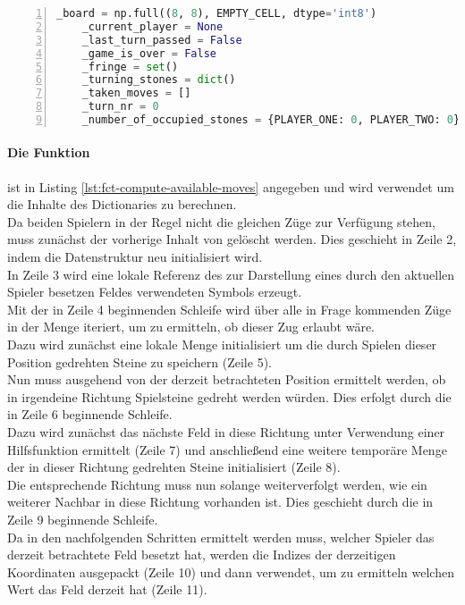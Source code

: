 \begin{lstlisting}[basicstyle=\footnotesize, caption = {Klassenvariablen der Klasse \mxZitat{Othello}}, language = python, captionpos = t , numbers=left, label={lst:class-vars-othello}]
    _board = np.full((8, 8), EMPTY_CELL, dtype='int8')
    _current_player = None 
    _last_turn_passed = False
    _game_is_over = False
    _fringe = set()
    _turning_stones = dict()    
    _taken_moves = []
    _turn_nr = 0
    _number_of_occupied_stones = {PLAYER_ONE: 0, PLAYER_TWO: 0}
\end{lstlisting}
\paragraph{Die Funktion }
 ist in Listing \ref{lst:fct-compute-available-moves} angegeben und wird verwendet um die Inhalte des Dictionaries  zu berechnen.
\\Da beiden Spielern in der Regel nicht die gleichen Züge zur Verfügung stehen, muss zunächst der vorherige Inhalt von  gelöscht werden. Dies geschieht in Zeile 2, indem die Datenstruktur neu initialisiert wird.
\\In Zeile 3 wird eine lokale Referenz des zur Darstellung eines durch den aktuellen Spieler besetzen Feldes verwendeten Symbols erzeugt.
\\Mit der in Zeile 4 beginnenden Schleife wird über alle in Frage kommenden Züge in der Menge  iteriert, um zu ermitteln, ob dieser Zug erlaubt wäre.
\\Dazu wird zunächst eine lokale Menge initialisiert um die durch Spielen dieser Position gedrehten Steine zu speichern (Zeile 5).
\\Nun muss ausgehend von der derzeit betrachteten Position ermittelt werden, ob in irgendeine Richtung Spielsteine gedreht werden würden. Dies erfolgt durch die in Zeile 6 beginnende Schleife.
\\Dazu wird zunächst das nächste Feld in diese Richtung unter Verwendung einer Hilfsfunktion ermittelt (Zeile 7) und anschließend eine weitere temporäre Menge der in dieser Richtung gedrehten Steine initialisiert (Zeile 8).
\\Die entsprechende Richtung muss nun solange weiterverfolgt werden, wie ein weiterer Nachbar in diese Richtung vorhanden ist. Dies geschieht durch die in Zeile 9 beginnende Schleife.
\\Da in den nachfolgenden Schritten ermittelt werden muss, welcher Spieler das derzeit betrachtete Feld besetzt hat, werden die Indizes der derzeitigen Koordinaten ausgepackt (Zeile 10) und dann verwendet, um zu ermitteln welchen Wert das Feld derzeit hat (Zeile 11).
